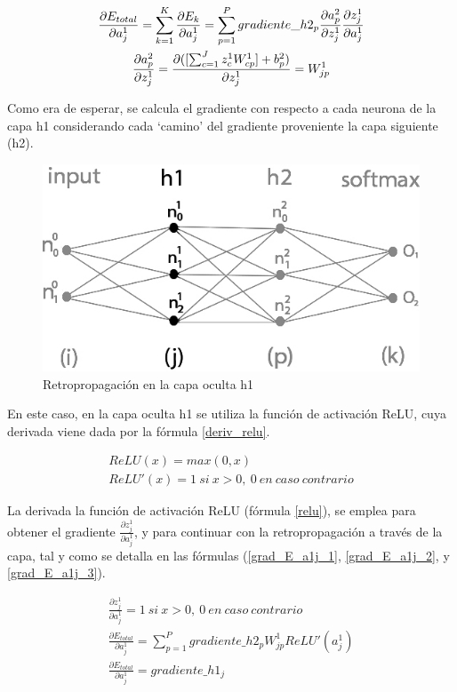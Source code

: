 \begin{gather}
	\frac{\partial E_{total}}{\partial a^1_j} = \sum_{k=1}^K \frac{\partial E_k}{\partial a^1_j} = \sum_{p=1}^P  gradiente\_h2_p   \frac{\partial a^2_p}{\partial z^1_j}   \frac{\partial z^1_j}{\partial a^1_j} \notag \\
	\frac{\partial a^2_p}{\partial z^1_j} = \frac{\partial( [\sum_{c=1}^{J} z^1_c   W^1_{cp}] + b^2_p)}{\partial z^1_j} = W^1_{jp} \notag
\end{gather}

Como era de esperar, se calcula el gradiente con respecto a cada neurona de la capa h1 considerando cada `camino' del gradiente proveniente la capa siguiente (h2).

\begin{figure}[H]
	\centering
	\includegraphics[scale=0.35]{imagenes/nn_2_capa_h1.jpg}  
	\caption{Retropropagación en la capa oculta h1}
\end{figure}

En este caso, en la capa oculta h1 se utiliza la función de activación ReLU, cuya derivada viene dada por la fórmula \ref{deriv_relu}. 

\begin{gather}
	ReLU(x) = max(0, x) \label{relu} \\
	ReLU'(x) = 1\ si\ x>0,\ 0\ en\ caso\ contrario
	\label{deriv_relu}
\end{gather}

La derivada la función de activación ReLU (fórmula \ref{relu}), se emplea para obtener el gradiente $\frac{\partial z^1_ j}{\partial a^1_j}$, y para continuar con la retropropagación a través de la capa, tal y como se detalla en las fórmulas (\ref{grad_E_a1j_1}, \ref{grad_E_a1j_2}, y \ref{grad_E_a1j_3}).


\begin{gather}
	\frac{\partial z^1_ j}{\partial a^1_j} = 1\ si\ x>0,\ 0\ en\ caso\ contrario \label{grad_E_a1j_1} \\
	\frac{\partial E_{total}}{\partial a^1_j} = \sum_{p=1}^P  gradiente\_h2_p   W^1_{jp}   ReLU'(a^1_j) \label{grad_E_a1j_2} \\
	\frac{\partial E_{total}}{\partial a^1_j} = gradiente\_h1_j
	\label{grad_E_a1j_3}
\end{gather}

